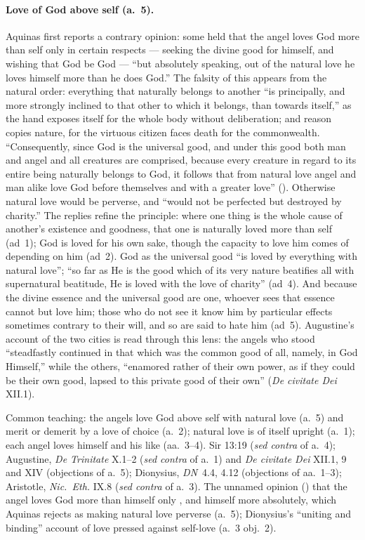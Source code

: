 \paragraph{Love of God above self (a.~5).} Aquinas first reports a
contrary opinion: some held that the angel loves God more than self only
in certain respects --- seeking the divine good for himself, and
wishing that God be God --- ``but absolutely speaking, out of the
natural love he loves himself more than he does God.'' The falsity of
this appears from the natural order: everything that naturally belongs
to another ``is principally, and more strongly inclined to that other to
which it belongs, than towards itself,'' as the hand exposes itself for
the whole body without deliberation; and reason copies nature, for the
virtuous citizen faces death for the commonwealth. ``Consequently, since
God is the universal good, and under this good both man and angel and
all creatures are comprised, because every creature in regard to its
entire being naturally belongs to God, it follows that from natural love
angel and man alike love God before themselves and with a greater love''
(). Otherwise natural love would be perverse,
and ``would not be perfected but destroyed by charity.'' The replies
refine the principle: where one thing is the whole cause of another's
existence and goodness, that one is naturally loved more than self
(ad~1); God is loved for his own sake, though the capacity to love him
comes of depending on him (ad~2). God as the universal good ``is loved
by everything with natural love''; ``so far as He is the good which of
its very nature beatifies all with supernatural beatitude, He is loved
with the love of charity'' (ad~4). And because the divine essence and
the universal good are one, whoever sees that essence cannot but love
him; those who do not see it know him by particular effects sometimes
contrary to their will, and so are said to hate him (ad~5). Augustine's
account of the two cities is read through this lens: the angels who
stood ``steadfastly continued in that which was the common good of all,
namely, in God Himself,'' while the others, ``enamored rather of their
own power, as if they could be their own good, lapsed to this private
good of their own'' (\emph{De civitate Dei} XII.1).

 {Common teaching: the angels love God above self with natural love
 (a.~5) and merit or demerit by a love of choice (a.~2); natural love is
 of itself upright (a.~1); each angel loves himself and his like
 (aa.~3--4).}
 {Sir 13:19 (\emph{sed contra} of a.~4); Augustine, \emph{De Trinitate}
 X.1--2 (\emph{sed contra} of a.~1) and \emph{De civitate Dei} XII.1, 9
 and XIV (objections of a.~5); Dionysius, \emph{DN}~4.4, 4.12
 (objections of aa.~1--3); Aristotle, \emph{Nic.\ Eth.} IX.8 (\emph{sed
 contra} of a.~3).}
 {The unnamed opinion () that the angel loves God more
 than himself only , and himself more absolutely, which
 Aquinas rejects as making natural love perverse (a.~5); Dionysius's
 ``uniting and binding'' account of love pressed against self-love
 (a.~3 obj.~2).}
